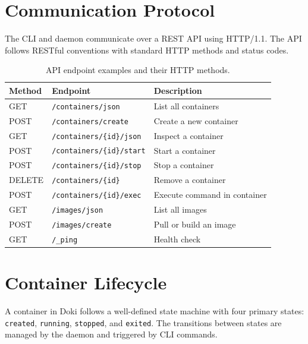 \section{Communication Protocol}
\label{sec:protocol}

The CLI and daemon communicate over a REST API using HTTP/1.1. The
API follows RESTful conventions with standard HTTP methods and status
codes.

\begin{table}[htbp]
  \centering
  \caption{API endpoint examples and their HTTP methods.}
  \label{tab:api-endpoints}
  \begin{tabularx}{\textwidth}{l l X}
    \toprule
    \textbf{Method} & \textbf{Endpoint} & \textbf{Description} \\
    \midrule
    GET    & \texttt{/containers/json}       & List all containers \\
    POST   & \texttt{/containers/create}     & Create a new container \\
    GET    & \texttt{/containers/\{id\}/json} & Inspect a container \\
    POST   & \texttt{/containers/\{id\}/start} & Start a container \\
    POST   & \texttt{/containers/\{id\}/stop}  & Stop a container \\
    DELETE & \texttt{/containers/\{id\}}     & Remove a container \\
    POST   & \texttt{/containers/\{id\}/exec} & Execute command in container \\
    GET    & \texttt{/images/json}           & List all images \\
    POST   & \texttt{/images/create}         & Pull or build an image \\
    GET    & \texttt{/\_ping}                & Health check \\
    \bottomrule
  \end{tabularx}
\end{table}

\section{Container Lifecycle}
\label{sec:lifecycle}

A container in Doki follows a well-defined state machine with four
primary states: \texttt{created}, \texttt{running},
\texttt{stopped}, and \texttt{exited}. The transitions between
states are managed by the daemon and triggered by CLI commands.


